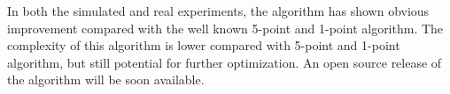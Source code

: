 \documentclass[letterpaper, 10 pt, conference]{ieeeconf}
\begin{document}
In both the simulated and real experiments, the algorithm has shown obvious improvement compared with the well known 5-point and 1-point algorithm. The complexity of this algorithm is lower compared with 5-point and 1-point algorithm, but still potential for further optimization. An open source release of the algorithm will be soon available. 



\end{document}
